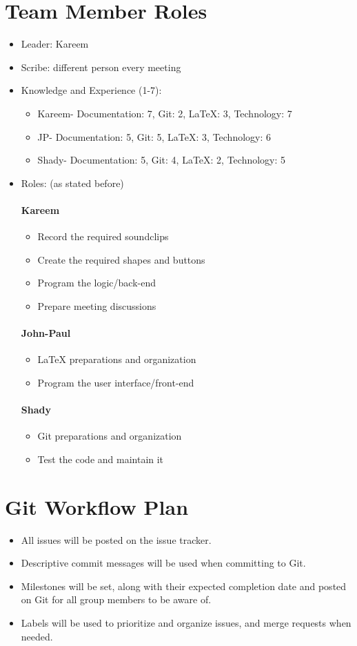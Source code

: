 \documentclass{article}
\begin{document}
\section{Team Member Roles}
\begin{itemize}
\item Leader: Kareem
\item Scribe: different person every meeting
\item Knowledge and Experience (1-7):
\begin{itemize}
\item Kareem- Documentation: 7, Git: 2, LaTeX: 3, Technology: 7
\item  JP- Documentation: 5, Git: 5, LaTeX: 3, Technology: 6
\item Shady- Documentation: 5, Git: 4, LaTeX: 2, Technology: 5
\end{itemize}
\item Roles: (as stated before)
\paragraph{Kareem}
\begin{itemize}
\item Record the required soundclips
\item Create the required shapes and buttons
\item Program the logic/back-end
\item Prepare meeting discussions
\end{itemize}
\paragraph{John-Paul}
\begin{itemize}
\item LaTeX preparations and organization
\item Program the user interface/front-end
\end{itemize}
\paragraph{Shady}
\begin{itemize}
\item Git preparations and organization
\item Test the code and maintain it
\end{itemize}
\end{itemize}
\section{Git Workflow Plan}
\begin{itemize}
\item All issues will be posted on the issue tracker.
\item Descriptive commit messages will be used when committing to Git. 
\item Milestones will be set, along with their expected completion date and posted on Git for all group members to be aware of.
\item Labels will be used to prioritize and organize issues, and merge requests when needed.
\end{itemize}
\end{document}
